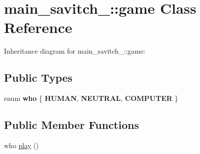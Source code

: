 \hypertarget{classmain__savitch__14_1_1game}{}\section{main\+\_\+savitch\+\_\+:\+:game Class Reference}
\label{classmain__savitch__14_1_1game}


Inheritance diagram for main\+\_\+savitch\+\_\+:\+:game\+:
\subsection*{Public Types}
\begin{DoxyCompactItemize}
\item 
enum {\bfseries who} \{ {\bfseries H\+U\+M\+AN}, 
{\bfseries N\+E\+U\+T\+R\+AL}, 
{\bfseries C\+O\+M\+P\+U\+T\+ER}
 \}\hypertarget{classmain__savitch__14_1_1game_a4fe20fb287f809ae2b68e28e4ccba634}{}\label{classmain__savitch__14_1_1game_a4fe20fb287f809ae2b68e28e4ccba634}

\end{DoxyCompactItemize}
\subsection*{Public Member Functions}
\begin{DoxyCompactItemize}
\item 
who \hyperlink{classmain__savitch__14_1_1game_a4dbeaddb78059f7c5dcbf5cc4e026317}{play} ()
\end{DoxyCompactItemize}
